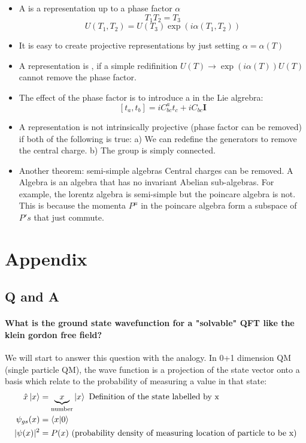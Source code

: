 \documentclass[12pt]{scrartcl}
\begin{document}
\begin{itemize}
\item A  is a representation up to a phase factor $\alpha$
$$T_1 T_2 = T_3$$
$$U(T_1, T_2) = U(T_3) \exp(i \alpha(T_1, T_2))$$
\item It is easy to create projective representations by just setting 
$\alpha = \alpha(T)$
\item A representation is , if a simple redifinition $U(T) \rightarrow \exp (i \alpha(T)) U(T)$ cannot remove the phase factor.
\item The effect of the phase factor is to introduce a  in the Lie algrebra:
$$[t_a, t_b] = i C^{a}_{b c} t_c + i C_{bc} \mathbf{I} $$
\item A representation is not intrinsically projective (phase factor can be removed) if both of the following is true:
a) We can redefine the generators to remove the central charge.
b) The group is simply connected.
\item Another theorem: semi-simple algebras  Central charges can be removed.  A  Algebra is an algebra that has no invariant Abelian sub-algebras.  For example, the lorentz algebra is semi-simple but the poincare algebra is not.  This is because the momenta $P^\mu$ in the poincare algebra form a subspace of $P's$ that just commute.
\end{itemize}






\section{Appendix}
\subsection{Q and A}
\paragraph{What is the ground state wavefunction for a "solvable" QFT like the klein gordon free field?}
We will start to answer this question with the analogy. In 0+1 dimension QM (single particle QM), the wave function is a projection of the state vector onto a basis which relate to the probability of measuring a value in that state:
\begin{align}
\hat{x} \ket{x} &= \underbrace{x}_{\text{number}} \ket{x}  \text{ Definition of the state labelled by x} \\
\psi_{gs}(x) &= \braket{x|0} \\
|\psi(x)|^2 &= P(x) \text{ (probability density of measuring location of particle to be x)} 
\end{align} 
\end{document}
